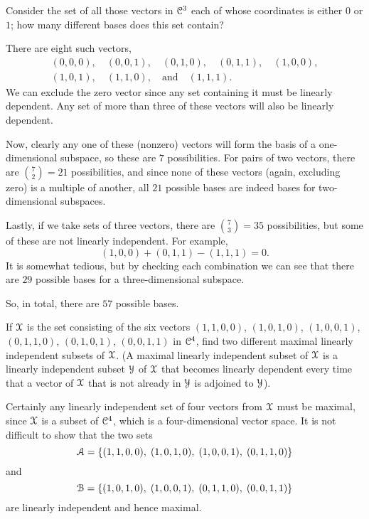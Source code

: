  Consider the set of all those vectors in $\mathcal{C}^3$ each of
whose coordinates is either $0$ or $1$; how many different bases does
this set contain?
\begin{solution}
  There are eight such vectors,
  \begin{multline*}
    (0,0,0),\quad (0,0,1),\quad (0,1,0), \quad (0,1,1), \quad (1,0,0), \\
    (1,0,1), \quad (1,1,0), \quad\text{and}\quad (1,1,1).
  \end{multline*}
  We can exclude the zero vector since any set containing it must be
  linearly dependent. Any set of more than three of these vectors will
  also be linearly dependent.

  Now, clearly any one of these (nonzero) vectors will form the basis
  of a one-dimensional subspace, so these are $7$ possibilities. For
  pairs of two vectors, there are $\binom72 = 21$ possibilities, and
  since none of these vectors (again, excluding zero) is a multiple of
  another, all $21$ possible bases are indeed bases for
  two-dimensional subspaces.

  Lastly, if we take sets of three vectors, there are $\binom73 = 35$
  possibilities, but some of these are not linearly independent. For
  example,
  \begin{equation*}
    (1,0,0) + (0,1,1) - (1,1,1) = 0.
  \end{equation*}
  It is somewhat tedious, but by checking each combination we can see
  that there are $29$ possible bases for a three-dimensional subspace.

  So, in total, there are $57$ possible bases.
\end{solution}

 If $\mathcal{X}$ is the set consisting of the six vectors
$(1,1,0,0)$, $(1,0,1,0)$, $(1,0,0,1)$, $(0,1,1,0)$, $(0,1,0,1)$,
$(0,0,1,1)$ in $\mathcal{C}^4$, find two different maximal linearly independent
subsets of $\mathcal{X}$. (A maximal linearly independent subset of $\mathcal{X}$ is a
linearly independent subset $\mathcal{Y}$ of $\mathcal{X}$ that becomes linearly
dependent every time that a vector of $\mathcal{X}$ that is not already in $\mathcal{Y}$
is adjoined to $\mathcal{Y}$).
\begin{solution}
  Certainly any linearly independent set of four vectors from $\mathcal{X}$
  must be maximal, since $\mathcal{X}$ is a subset of $\mathcal{C}^4$, which is a
  four-dimensional vector space. It is not difficult to show that the
  two sets
  \begin{equation*}
    \mathcal{A} = \{(1,1,0,0),\;(1,0,1,0),\;(1,0,0,1),\;(0,1,1,0)\}
  \end{equation*}
  and
  \begin{equation*}
    \mathcal{B} = \{(1,0,1,0),\;(1,0,0,1),\;(0,1,1,0),\;(0,0,1,1)\}
  \end{equation*}
  are linearly independent and hence maximal.
\end{solution}
